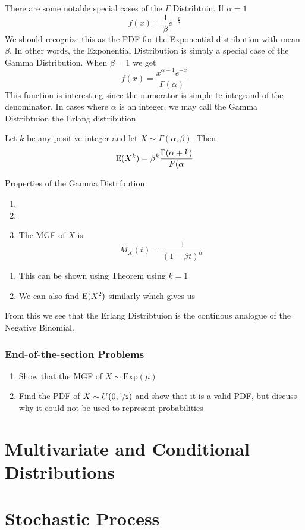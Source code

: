 \documentclass{report}
\begin{document}
There are some notable special cases of the $\Gamma $ Distribtuin. If $\alpha = 1 $
\[
    f(x)=\frac 1\beta e^{-\frac x \beta}
\]
We should recognize this as the PDF for the Exponential distribution with mean $\beta$. In other words, the Exponential Distribution is simply a special case of the Gamma Distribution. When $\beta=1$ we get
\[
    f(x)=\frac{x^{\alpha-1}e^{-x}}{\Gamma(\alpha)}
\]
This function is interesting since the numerator is simple te integrand of the denominator. In cases where $\alpha$ is an integer, we may call the Gamma Distribtuion the Erlang distribution.
\begin{theorem}
    Let $k$ be any positive integer and let $X\sim \Gamma(\alpha,\beta)$. Then
    \[
        \textup{E}(X^k)=\beta^k \frac{\Gamma(\alpha+k)}{F(\alpha}
    \]
    
\end{theorem}

\begin{theorem}
    {Properties of the Gamma Distribution}
    \begin{enumerate}
        \item 
        \item 
        \item The MGF of $X$ is 
        \[
            M_X(t)=\frac 1 {(1-\beta t)^\alpha}
        \]
    \end{enumerate}
    \begin{enumerate}
        \item This can be shown using Theorem \todo using $k=1$
        \item We can also find $\textup{E}(X^2)$ similarly which gives us
    \end{enumerate}
\end{theorem}

From this we see that the Erlang Distribtuion is the continous analogue of the Negative Binomial.



\subsection*{End-of-the-section Problems}
\begin{enumerate}
    \item Show that the MGF of $X\sim \text{Exp}(\mu)$ \todo
    \item Find the PDF of $X\sim U(0,\nicefrac 1 2)$ and show that it is a valid PDF, but discuss why it could not be used to represent probabilities
\end{enumerate}

\chapter{Multivariate and Conditional Distributions}

\chapter{Stochastic Process}
\end{document}
